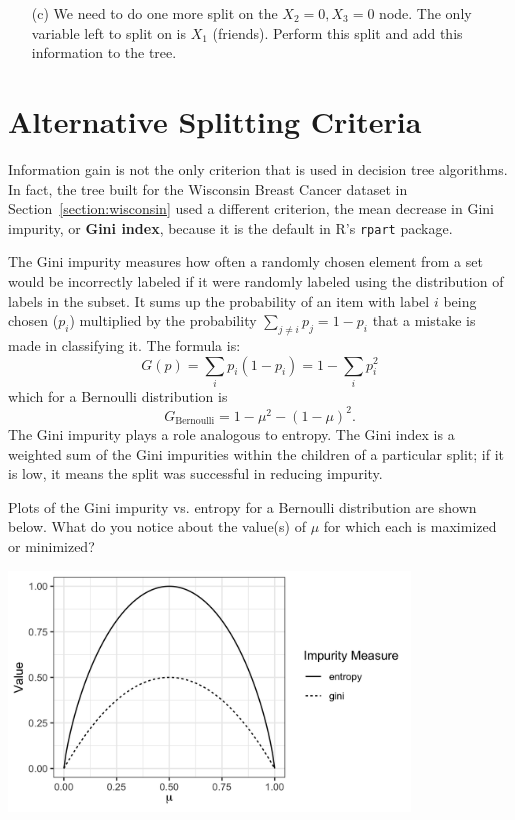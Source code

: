 \begin{question}{}
\begin{enumerate}
\item[(c)] We need to do one more split on the $X_2 = 0, X_3 = 0$ node. The only variable left to split on is $X_1$ (friends). Perform this split and add this information to the tree. 
\end{enumerate}
\end{question}


\section{Alternative Splitting Criteria}

Information gain is not the only criterion that is used in decision tree algorithms. In fact, the tree built for the Wisconsin Breast Cancer dataset in Section~\ref{section:wisconsin} used a different criterion, the mean decrease in Gini impurity, or \textbf{Gini index}, because it is the default in R's \texttt{rpart} package. 

The Gini impurity measures how often a randomly chosen element from a set would be incorrectly labeled if it were randomly labeled using the distribution of labels in the subset. It sums up the probability of an item with label $i$ being chosen ($p_i$) multiplied by the probability $\sum_{j \neq i} p_j = 1 - p_i$ that a mistake is made in classifying it. The formula is:
$$ G(p) = \sum_{i} p_i (1 - p_i) = 1 - \sum_i p_i^2 $$
which for a Bernoulli distribution is 
$$ G_\text{Bernoulli} = 1 - \mu^2 - (1-\mu)^2. $$
The Gini impurity plays a role analogous to entropy. The Gini index is a weighted sum of the Gini impurities within the children of a particular split; if it is low, it means the split was successful in reducing impurity. 

\vspace{3mm}

\begin{question}{}
Plots of the Gini impurity vs. entropy for a Bernoulli distribution are shown below. What do you notice about the value(s) of $\mu$ for which each is maximized or minimized?
\begin{center}
\includegraphics[width=0.8\textwidth]{img/comparison-entropy-gini-bernoulli.png}
\end{center}
\end{question}

